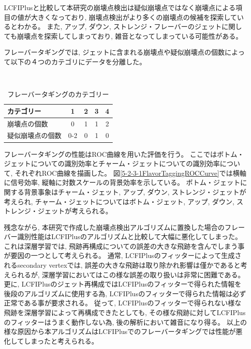LCFIPlusと比較して本研究の崩壊点検出は疑似崩壊点ではなく崩壊点による項目の値が大きくなっており, 崩壊点検出がより多くの崩壊点の候補を探索しているとわかる。
また, アップ, ダウン, ストレンジ・フレーバーのジェットに関しても崩壊点を探索してしまっており, 雑音となってしまっている可能性がある。

フレーバータギングでは, ジェットに含まれる崩壊点や疑似崩壊点の個数によって以下の$４$つのカテゴリにデータを分離した。

\begin{table}[htb]
 \centering
　\small
  \caption{フレーバータギングのカテゴリー}
  \begin{tabular}{l c c c c}\hline
    カテゴリー & 1 & 2 & 3 & 4\\\hline\hline
    崩壊点の個数 & 0 & 1 & 1 & 2\\
    疑似崩壊点の個数 & 0-2 & 0 & 1 & 0\\\hline
  \end{tabular}
  \label{TheNumberofReconstructedVertices}
\end{table}

フレーバータギングの性能はROC曲線を用いた評価を行う。
ここではボトム・ジェットについての識別効率とチャーム・ジェットについての識別効率について, それぞれROC曲線を描画した。
図\ref{5-2-3-1FlavorTaggingROCCurve}では横軸に信号効率, 縦軸に対数スケールの背景効率を示している。
ボトム・ジェットに関する背景事象はチャーム・ジェット, アップ, ダウン, ストレンジ・ジェットが考えられ, チャーム・ジェットについてはボトム・ジェット, アップ, ダウン, ストレンジ・ジェットが考えられる。

残念ながら, 本研究で作成した崩壊点検出アルゴリズムに置換した場合のフレーバー識別性能はLCFIPlusのアルゴリズムと比較して大幅に悪化してしまった。
これは深層学習では, 飛跡再構成についての誤差の大きな飛跡を含んでしまう事が要因の一つとして考えられる。
通常, LCFIPlusのフィッターによって生成されるsecondary vertexでは, 誤差の大きな飛跡は取り除かれ影響は僅かであると考えられるが, 深層学習においてはこの様な誤差の取り扱いは非常に困難である。
更に, LCFIPlusのジェット再構成ではLCFIPlusのフィッターで得られた情報を後段のアルゴリズムに使用する為, LCFIPlusのフィッターで得られた情報は必ず正常である事が要求される。
従って, LCFIPlusのフィッターで得られない様な飛跡を深層学習によって再構成できたとしても, その様な飛跡に対してLCFIPlusのフィッターはうまく動作しない為, 後の解析において雑音になり得る。
以上の様な原因から本アルゴリズムはLCFIPlusでのフレーバータギングでは性能が悪化してしまったと考えられる。

